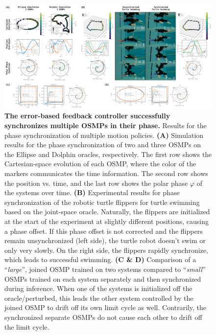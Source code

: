 \begin{figure}[h!]
    \centering
    \includegraphics[width=1.0\linewidth]{osmp/figures/phase_sync_results/phase_sync_results_v2_compressed.pdf}
    \caption{\textbf{The error-based feedback controller successfully synchronizes multiple \glspl{OSMP} in their phase.}
    Results for the phase synchronization of multiple motion policies.
    \textbf{(A)} Simulation results for the phase synchronization of two and three \glspl{OSMP} on the Ellipse and Dolphin oracles, respectively. The first row shows the Cartesian-space evolution of each \gls{OSMP}, where the color of the markers communicates the time information. The second row shows the position vs. time, and the last row shows the polar phase $\varphi$ of the systems over time.
    \textbf{(B)} Experimental results for phase synchronization of the robotic turtle flippers for turtle swimming based on the joint-space oracle. Naturally, the flippers are initialized at the start of the experiment at slightly different positions, causing a phase offset. If this phase offset is not corrected and the flippers remain unsynchronized (left side), the turtle robot doesn't swim or only very slowly. On the right side, the flippers rapidly synchronize, which leads to successful swimming.
    \textbf{(C \& D)} Comparison of a ``\emph{large}'', joined \gls{OSMP} trained on two systems compared to ``\emph{small}'' \glspl{OSMP} trained on each system separately and then synchronized during inference. When one of the systems is initialized off the oracle/perturbed, this leads the other system controlled by the joined \gls{OSMP} to drift off its own limit cycle as well. Contrarily, the synchronized separate \glspl{OSMP} do not cause each other to drift off the limit cycle.
    }
    \label{fig:osmp:phase_sync_results}
\end{figure}


